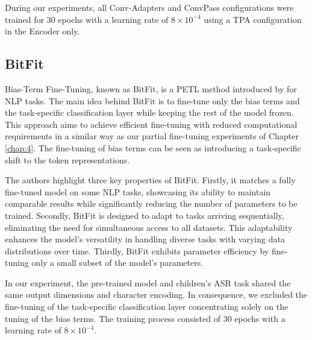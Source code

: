 During our experiments, all Conv-Adapters and ConvPass configurations were trained for 30 epochs with a learning rate of $8 \times 10^{-4}$ using a \ac{TPA} configuration in the Encoder only.


\subsection{BitFit}
Bias-Term Fine-Tuning, known as BitFit, is a \ac{PETL} method introduced by \cite{ben-zaken-etal-2022-bitfit} for \ac{NLP} tasks. The main idea behind BitFit is to fine-tune only the bias terms and the task-specific classification layer while keeping the rest of the model frozen. This approach aims to achieve efficient fine-tuning with reduced computational requirements in a similar way as our partial fine-tuning experiments of Chapter \ref{chap:4}. The fine-tuning of bias terms can be seen as introducing a task-specific shift to the token representations.

The authors highlight three key properties of BitFit. Firstly, it matches a fully fine-tuned model on some \ac{NLP} tasks, showcasing its ability to maintain comparable results while significantly reducing the number of parameters to be trained. Secondly, BitFit is designed to adapt to tasks arriving sequentially, eliminating the need for simultaneous access to all datasets. This adaptability enhances the model's versatility in handling diverse tasks with varying data distributions over time. Thirdly, BitFit exhibits parameter efficiency by fine-tuning only a small subset of the model's parameters.

In our experiment, the pre-trained model and children's \ac{ASR} task shared the same output dimensions and character encoding. In consequence, we excluded the fine-tuning of the task-specific classification layer concentrating solely on the tuning of the bias terms. The training process consisted of 30 epochs with a learning rate of $8 \times 10^{-4}$.

